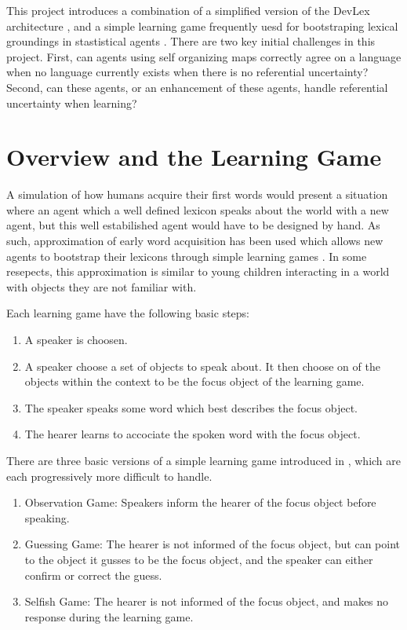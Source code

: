 \documentclass[11pt]{article}
\begin{document}
This project introduces a combination of a simplified version of the DevLex
architecture \cite{LiDevLex}, and a simple learning game frequently uesd for
bootstraping lexical groundings in stastistical agents \cite{VogtLearningSim,VogtSocial}.  There
are two key initial challenges in this project.  First, can agents using self organizing maps
correctly agree on a language when no language currently exists when there is no
referential uncertainty?  Second, can these agents, or an enhancement of these
agents, handle referential uncertainty when learning?

\section{Overview and the Learning Game}
A simulation of how humans acquire their first words would present a situation where
an agent which a well defined lexicon speaks about the world with a new agent,
but this well estabilished agent would have to be designed by hand.  As such, 
approximation of early word acquisition has been used which allows new agents to
bootstrap their lexicons through simple learning games
\cite{VogtLearningSim,VogtSocial}.  In some resepects, this
approximation is similar to young children interacting in a world with objects they are
not familiar with.  

Each learning game have the following basic steps:
\begin{enumerate}
  \item A speaker is choosen.
  \item A speaker choose a set of objects to speak about.  It then choose on of
  the objects within the context to be the focus object of the learning game.
  \item The speaker speaks some word which best describes the focus object.
  \item The hearer learns to accociate the spoken word with the focus object.
\end{enumerate}

There are three basic versions of a simple learning game introduced in
\cite{VogtLearningSim}, which are each progressively more difficult to handle.

\begin{enumerate}
  \item Observation Game: Speakers inform the hearer of the focus object before
  speaking.
  \item Guessing Game: The hearer is not informed of the focus object, but can
  point to the object it gusses to be the focus object, and the speaker can
  either confirm or correct the guess.
  \item Selfish Game: The hearer is not informed of the focus object, and makes
  no response during the learning game.
\end{enumerate}
\end{document}
